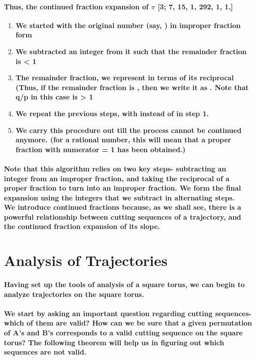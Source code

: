 \documentclass{report}
\begin{document}
\paragraph{Thus, the continued fraction expansion of $\pi$  [3; 7, 15, 1, 292, 1, 1,\cdots]}

\begin{enumerate}

\item \textbf{We started with the original number (say, ) in improper fraction form}
\item \textbf{We subtracted an integer from it such that the remainder fraction is < 1}
\item \textbf{The remainder fraction, we represent in terms of its reciprocal (Thus, if the remainder fraction is , then we write it as . Note that q/p in this case is > 1}
\item \textbf{We repeat the previous steps, with  instead of  in step 1.}
\item \textbf{We carry this procedure out till the process cannot be continued anymore. (for a rational number, this will mean that a proper fraction with numerator = 1 has been obtained.)}
\end{enumerate}

\paragraph{Note that this algorithm relies on two key steps- subtracting an integer from an improper fraction, and taking the reciprocal of a proper fraction to turn into an improper fraction. We form the final expansion using the integers that we subtract in alternating steps.
\\
We introduce continued fractions because, as we shall see, there is a powerful relationship between cutting sequences of a trajectory, and the continued fraction expansion of its slope.}

\section{Analysis of Trajectories}

\paragraph{Having set up the tools of analysis of a square torus, we can begin to analyze trajectories on the square torus. 
\\ \\
We start by asking an important question regarding cutting sequences- which of them are valid? How can we be sure that a given permutation of A’s and B’s corresponds to a valid cutting sequence on the square torus? The following theorem will help us in figuring out which sequences are not valid.}
\end{document}
